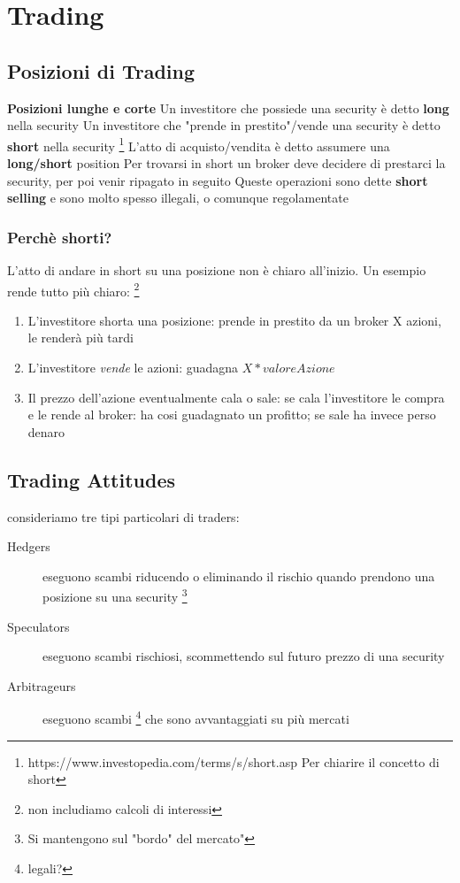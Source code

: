 \documentclass[a4paper,11pt]{report}
\begin{document}
{\newpage

\chapter{Trading}
\section{Posizioni di Trading}
	\textbf{Posizioni lunghe e corte} \newline
	Un investitore che possiede una security è detto \textbf{long} nella security \newline
	Un investitore che "prende in prestito"/vende una security è detto \textbf{short} nella security \newline \footnote{https://www.investopedia.com/terms/s/short.asp    Per chiarire il concetto di short}
	L'atto di acquisto/vendita è detto assumere una \textbf{long/short} position  \newline
	Per trovarsi in short un broker deve decidere di prestarci la security, per poi venir ripagato in seguito \newline
	Queste operazioni sono dette \textbf{short selling} e sono molto spesso illegali, o comunque regolamentate
\subsection{Perchè shorti?}
	L'atto di andare in short su una posizione non è chiaro all'inizio. Un esempio rende tutto più chiaro: \footnote{non includiamo calcoli di interessi}
\begin{enumerate}
	\item L'investitore shorta una posizione: prende in prestito da un broker X azioni, le renderà più tardi 
	\item L'investitore \emph{vende} le azioni: guadagna  $X*valoreAzione$
	\item Il prezzo dell'azione eventualmente cala o sale: se cala l'investitore le compra e le rende al broker: ha cosi guadagnato un profitto; se sale ha invece perso denaro
\end{enumerate}

\newpage

\section{Trading Attitudes}
	consideriamo tre tipi particolari di traders:
\begin{description}
	\item[Hedgers] eseguono scambi riducendo o eliminando il rischio quando prendono una posizione su una security \footnote{ 		Si mantengono sul "bordo" del mercato"}
	\item[Speculators] eseguono scambi rischiosi, scommettendo sul futuro prezzo di una security
	\item[Arbitrageurs] eseguono scambi \footnote{legali?} che sono avvantaggiati su più mercati
\end{description}
}
\end{document}
